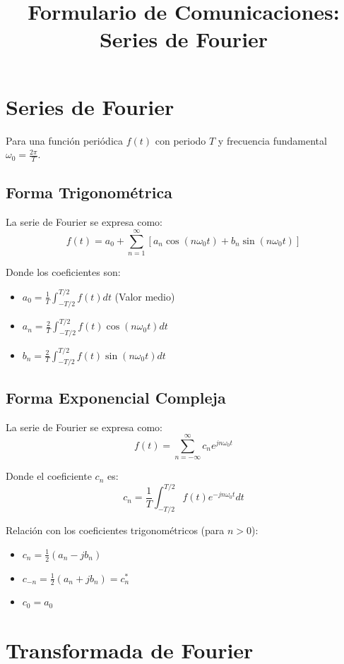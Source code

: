 \documentclass{article}
\title{Formulario de Comunicaciones: Series de Fourier}
\author{}
\date{}
\begin{document}
\maketitle

\section{Series de Fourier}

Para una función periódica $f(t)$ con periodo $T$ y frecuencia fundamental $\omega_0 = \frac{2\pi}{T}$.

\subsection{Forma Trigonométrica}
La serie de Fourier se expresa como:
\[ f(t) = a_0 + \sum_{n=1}^{\infty} [a_n \cos(n\omega_0 t) + b_n \sin(n\omega_0 t)] \]

Donde los coeficientes son:
\begin{itemize}
      \item $a_0 = \frac{1}{T} \int_{-T/2}^{T/2} f(t) dt$ (Valor medio)
      \item $a_n = \frac{2}{T} \int_{-T/2}^{T/2} f(t) \cos(n\omega_0 t) dt$
      \item $b_n = \frac{2}{T} \int_{-T/2}^{T/2} f(t) \sin(n\omega_0 t) dt$
\end{itemize}

\subsection{Forma Exponencial Compleja}
La serie de Fourier se expresa como:
\[ f(t) = \sum_{n=-\infty} ^{\infty} c_n e^{j n \omega_0 t} \]

Donde el coeficiente $c_n$ es:
\[ c_n = \frac{1}{T} \int_{-T/2}^{T/2} f(t) e^{-j n \omega_0 t} dt \]

Relación con los coeficientes trigonométricos (para $n > 0$):
\begin{itemize}
      \item $c_n = \frac{1}{2}(a_n - jb_n)$
      \item $c_{-n} = \frac{1}{2}(a_n + jb_n) = c_n^*$
      \item $c_0 = a_0$
\end{itemize}

\section{Transformada de Fourier}
\end{document}
